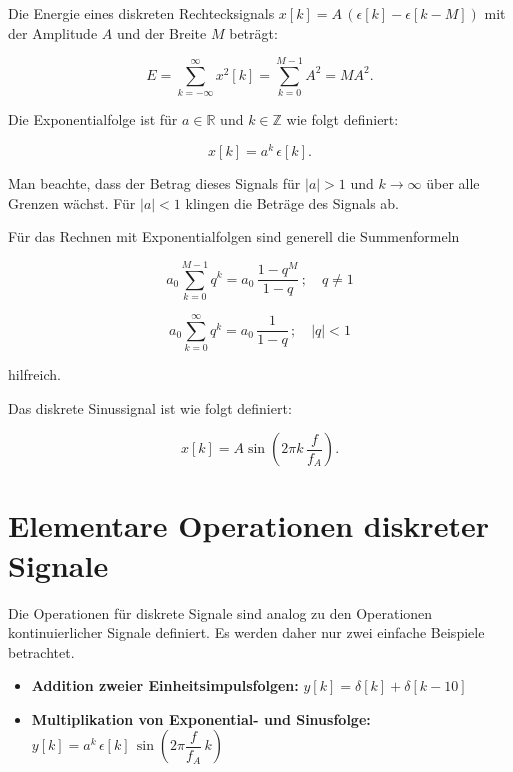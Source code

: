 Die Energie eines diskreten Rechtecksignals $x[k] = A\,(\epsilon[k] - \epsilon[k-M])$ mit der Amplitude $A$ und der Breite $M$ beträgt:

$$
E = \sum_{k=-\infty}^{\infty} x^2[k] = \sum_{k=0}^{M-1} A^2 = M A^2.
$$

\begin{definition}
Die Exponentialfolge ist für $a \in \mathbb{R}$ und $k \in \mathbb{Z}$ wie folgt definiert:

$$
x[k] = a^k\,\epsilon[k].
$$
\end{definition}

Man beachte, dass der Betrag dieses Signals für $|a| > 1$ und $k \to \infty$ über alle Grenzen wächst. Für $|a| < 1$ klingen die Beträge des Signals ab.


\begin{bemerkung}
Für das Rechnen mit Exponentialfolgen sind generell die Summenformeln

$$
a_0 \sum_{k=0}^{M-1} q^k = a_0\,\frac{1 - q^M}{1 - q}\,; \quad q \neq 1
$$

$$
a_0 \sum_{k=0}^{\infty} q^k = a_0\,\frac{1}{1 - q}\,; \quad |q| < 1
$$

hilfreich.
\end{bemerkung}

\begin{definition}
Das diskrete Sinussignal ist wie folgt definiert:

$$
x[k] = A\sin\!\left(2\pi k\,\frac{f}{f_A}\right).
$$

\end{definition}

\section{Elementare Operationen diskreter Signale}
\label{sec:elementare-operationen-diskret}

Die Operationen für diskrete Signale sind analog zu den Operationen kontinuierlicher Signale definiert. Es werden daher nur zwei einfache Beispiele betrachtet.

\begin{itemize}
  \item \textbf{Addition zweier Einheitsimpulsfolgen:} $y[k] = \delta[k] + \delta[k - 10]$


  \item \textbf{Multiplikation von Exponential- und Sinusfolge:} $y[k] = a^k\,\epsilon[k]\,\sin\!\left(2\pi\dfrac{f}{f_A}\,k\right)$

\end{itemize}

